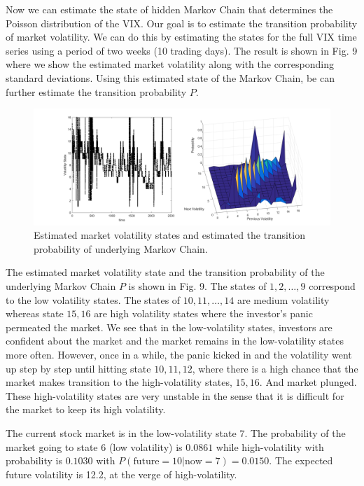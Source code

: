 \documentclass[a4paper, 11pt]{article}
\begin{document}
Now we can estimate the state of hidden Markov Chain that determines the Poisson distribution of the VIX. Our goal is to estimate the transition probability of market volatility. We can do this by estimating the states for the full VIX time series using a period of two weeks (10 trading days). The result is shown in Fig. 9 where we show the estimated market volatility along with the corresponding standard deviations. Using this estimated state of the Markov Chain, be can further estimate the transition probability $P$. 

\begin{figure}
	\begin{center}
		\includegraphics[width=6.5in]{p57d.png}
		\caption{Estimated market volatility states and estimated the transition probability of underlying Markov Chain.} 
	\end{center}
\end{figure}

The estimated market volatility state and the transition probability of the underlying Markov Chain $P$ is shown in Fig. 9. The states of $1,2,\dots, 9$ correspond to the low volatility states. The states of $10, 11, \dots, 14$ are medium volatility whereas state $15, 16$ are high volatility states where the investor's panic permeated the market. We see that in the low-volatility states, investors are confident about the market and the market remains in the low-volatility states more often. However, once in a while, the panic kicked in and the volatility went up step by step until hitting state $10, 11, 12$, where there is a high chance that the market makes transition to the high-volatility states, $15, 16$. And market plunged. These high-volatility states are very unstable in the sense that it is difficult for the market to keep its high volatility. 


The current stock market is in the low-volatility state $7$. The probability of the market going to state $6$ (low volatility) is $0.0861$ while high-volatility with probability is $0.1030$ with $P(\text{future}=10|\text{now}=7) = 0.0150$. The expected future volatility is 12.2, at the verge of high-volatility. 
\end{document}
